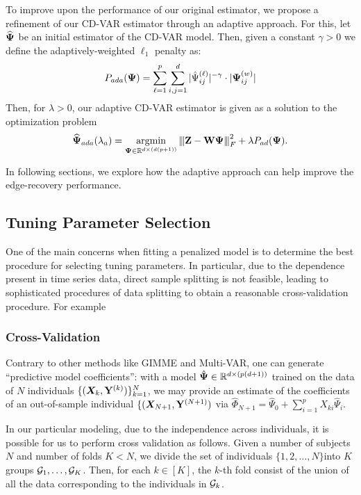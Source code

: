 To improve upon the performance of our original estimator, we propose a refinement of our CD-VAR estimator through an adaptive approach. For this, let $\widehat{\bm{\Psi}}$ be an initial estimator of the CD-VAR model. Then, given a constant $\gamma > 0$ we define the adaptively-weighted $\ell_1$ penalty as:
\begin{equation}
	P_{ada}(\bm{\Psi})  = \sum_{\ell = 1}^{p}\sum_{i, j=1}^{d}  |\hat \Psi^{(\ell)}_{ij}|^{-\gamma}\cdot |\bm{\Psi}^{(w)}_{ij}|
\end{equation}
Then, for $\lambda >0$, our adaptive CD-VAR estimator is given as a solution to the optimization problem
\begin{equation*}\label{eq:rvar_opt}
	\widehat{\bm{\Psi}}_{ada}(\lambda_a) = \mathop{\mathrm{argmin}}_{\bm{\Psi} \in \mathbb{R}^{d \times (d(p+1))}} {\left\vert\kern-0.25ex\left\vert\kern-0.25ex\left\vert  \mathbf{Z} - \mathbf{W} \bm{\Psi}  \right\vert\kern-0.25ex\right\vert\kern-0.25ex\right\vert}_{F}^2 + \lambda P_{ad}(\bm{\Psi}).
\end{equation*}

In following sections, we explore how the adaptive approach can help improve the edge-recovery performance. 


\subsection{Tuning Parameter Selection}

One of the main concerns when fitting a penalized model is to determine the best procedure for selecting tuning parameters. In particular, due to the dependence present in time series data, direct sample splitting is not feasible, leading to sophisticated procedures of data splitting to obtain a reasonable cross-validation procedure. For example 

\subsubsection{Cross-Validation}

Contrary to other methods like GIMME and Multi-VAR, one can generate ``predictive model coefficients'': with a model $\hat{\bm{\Psi}}\in\mathbb{R}^{d\times (p(d+1))}$ trained on the data of $N$ individuals $\{(\bm{X}_k, \mathbf{Y}^{(k)})\}_{k=1}^N$, we may provide an estimate of the coefficients of an out-of-sample individual $\{(\bm{X}_{N+1}, \mathbf{Y}^{(N+1)})$ via $\hat\Phi_{N+1} = \hat\Psi_{0} + \sum_{i=1}^p X_{ki} \hat\Psi_{i}$.

In our particular modeling, due to the independence across individuals, it is possible for us to perform cross validation as follows. Given a number of subjects $N$ and number of folds $K< N$, we divide the set of individuals $\{1,2,\ldots, N\} $into $K$ groups $\mathcal{G}_1,\ldots, \mathcal{G}_K$. Then, for each $k\in[K]$, the $k$-th fold consist of the union of all the data corresponding to the individuals in $\mathcal{G}_k$. 

